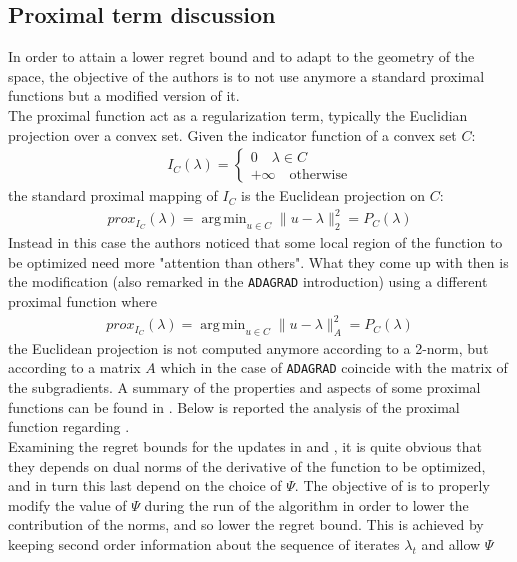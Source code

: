 \documentclass[notitlepage]{article}
\DeclareMathOperator*{\argmin}{arg\,min}
\begin{document}
\subsection{Proximal term discussion}
In order to attain a lower regret bound and to adapt to the geometry of the space, the objective of the authors is to not use anymore a standard proximal functions but a modified version of it.\\
The proximal function act as a regularization term, typically the Euclidian projection over a convex set. Given the indicator function of a convex set $C$:
\begin{align*}
  I_C(\lambda) = \begin{cases}
    0 \quad \lambda \in C \\
    +\infty \quad \text{otherwise}
  \end{cases}
\end{align*}
the standard proximal mapping of $I_C$ is the Euclidean projection on $C$:
\begin{align*}
  prox_{I_C}(\lambda) = \argmin_{u \in C} \| u - \lambda \|_2^2 = P_C(\lambda)
\end{align*}
Instead in this case the authors noticed that some local region of the function to be optimized need more "attention than others". What they come up with then is the modification (also remarked in the \texttt{ADAGRAD} introduction) using a different proximal function where  
\begin{align*}
  prox_{I_C}(\lambda) = \argmin_{u \in C} \| u - \lambda \|_A^2 = P_C(\lambda)
\end{align*}
the Euclidean projection is not computed anymore according to a 2-norm, but according to a matrix $A$ which in the case of \texttt{ADAGRAD} coincide with the matrix of the subgradients. A summary of the properties and aspects of some proximal functions 
can be found in \cite{OPT-003}. Below is reported the analysis of the proximal function regarding \cite{JMLR:v12:duchi11a}.\\
Examining the regret bounds for the updates in \cite{Nesterov2009} and \cite{NIPS2009_7cce53cf}, it is quite obvious that they depends on dual norms of the derivative of the function to be optimized, and in turn this last depend on the choice of $\Psi$. The objective of \cite{JMLR:v12:duchi11a} 
is to properly modify the value of $\Psi$ during the run of the algorithm in order to lower the contribution of the norms, and so lower the regret bound. This is achieved by keeping second order information about the sequence of iterates $\lambda_t$ and allow $\Psi$ 
\end{document}
